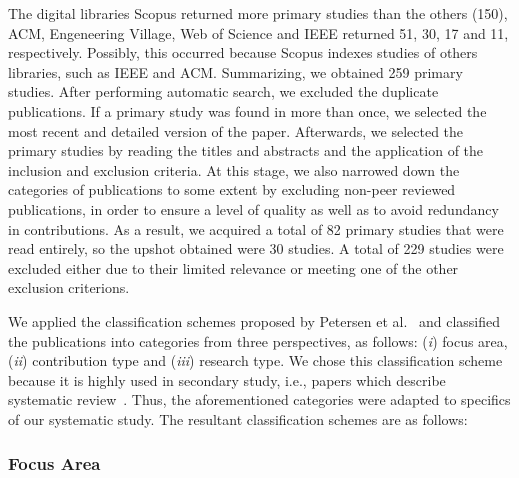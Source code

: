 The digital libraries Scopus returned more primary studies than the others (150), ACM, Engeneering Village, Web of Science and IEEE returned 51, 30, 17 and 11, respectively. Possibly, this occurred because Scopus indexes studies of others libraries, such as IEEE and ACM. Summarizing, we obtained 259 primary studies. After performing automatic search, we excluded the duplicate publications. If a primary study was found in more than once, we selected the most recent and detailed version of the paper. Afterwards, we selected the primary studies by reading the titles and abstracts and the application of the inclusion and exclusion criteria. At this stage, we also narrowed down the categories of publications to some extent by excluding non-peer reviewed publications, in order to ensure a level of quality as well as to avoid redundancy in contributions. As a result, we acquired a total of 82 primary studies that were read entirely, so the upshot obtained were 30 studies. A total of 229 studies were excluded either due to their limited relevance or meeting one of the other exclusion criterions.

We applied the classification schemes proposed by Petersen et al.~\cite{Petersen:2008:SMS:2227115.2227123} and classified the publications into categories from three perspectives, as follows: (\textit{i}) focus area, (\textit{ii}) contribution type and (\textit{iii}) research type. We chose this classification scheme because it is highly used in secondary study, i.e., papers which describe systematic review~\cite{Durelli:2013:SRM:2480362.2480567}.%
 Thus, the aforementioned categories were adapted to specifics of our systematic study. The resultant classification schemes are as follows:

\subsubsection{Focus Area}

